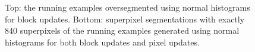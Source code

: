 \begin{figure}[t]
{	}
	\caption[Superpixel segmentations of the running examples generated by a variant of \textbf{SEEDS} \cite{VanDenBerghBoixRoigCapitaniVanGool:2012} based on normal histograms.]{Top: the running examples oversegmented using normal histograms for block updates. Bottom: superpixel segmentations with exactly $840$ superpixels of the running examples generated using normal histograms for both block updates and pixel updates.}
	\label{fig:seeds-depth-normal-histograms-comparison}
\end{figure}

